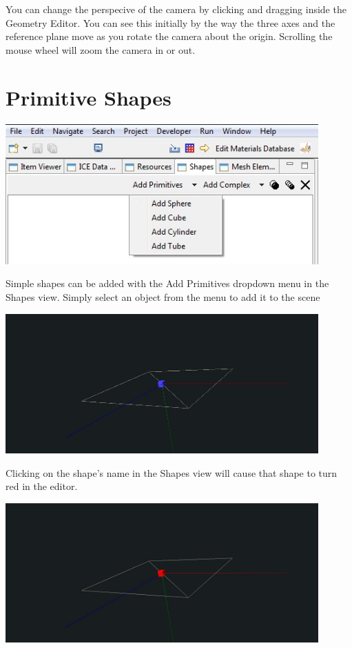 \documentclass{article}
\begin{document}
You can change the perspecive of the camera by clicking and dragging inside the
Geometry Editor. You can see this initially by the way the three axes and the
reference plane move as you rotate the camera about the origin. Scrolling the
mouse wheel will zoom the camera in or out.

\section{Primitive Shapes}

\begin{center}
\includegraphics[width=12cm]{images/GeometryAddPrimitive.jpg}
\end{center}

Simple shapes can be added with the Add Primitives dropdown menu in the Shapes
view. Simply select an object from the menu to add it to the scene

\begin{center}
\includegraphics[width=12cm]{images/GeometryAddCube.jpg}
\end{center}

Clicking on the shape's name in the Shapes view will cause that shape to turn
red in the editor.

\begin{center}
\includegraphics[width=12cm]{images/GeometrySelectCube.jpg}
\end{center}
\end{document}

